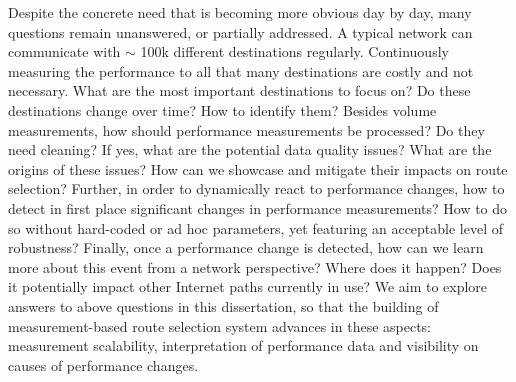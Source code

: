 



Despite the concrete need that is becoming more obvious day by day, many questions remain unanswered, or partially addressed.
A typical network can communicate with $\sim$ 100k different destinations regularly. 
Continuously measuring the performance to all that many destinations are costly and not necessary. 
What are the most important destinations to focus on? Do these destinations change over time? How to identify them?
Besides volume measurements, how should performance measurements be processed? Do they need cleaning?
If yes, what are the potential data quality issues? What are the origins of these issues? How can we showcase and mitigate their impacts on route selection?
Further, in order to dynamically react to performance changes, how to detect in first place significant changes in performance measurements? How to do so without hard-coded or ad hoc parameters, yet featuring an acceptable level of robustness?
Finally, once a performance change is detected, how can we learn more about this event from a network perspective? Where does it happen? Does it potentially impact other Internet paths currently in use? 
We aim to explore answers to above questions in this dissertation, so that the building of measurement-based route selection system advances in these aspects: measurement scalability, interpretation of performance data and visibility on causes of performance changes. 

